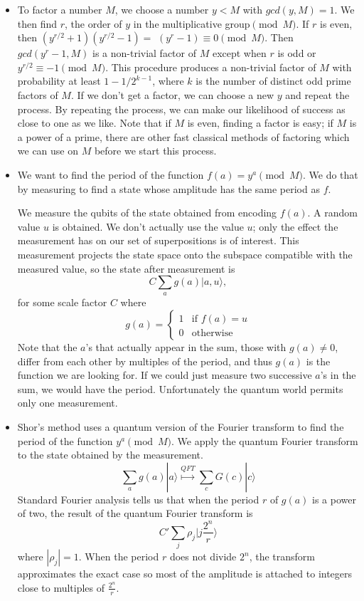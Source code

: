 \documentclass{article}
\def\ket#1{|{#1}\rangle}
\begin{document}
\begin{itemize}
	\item To factor a number $M$, we choose a number $y < M$ with $gcd(y,M) = 1$.  We then find $r$, the order of $y$ in the multiplicative group$\pmod M$.  If $r$ is even, then $(y^{r/2}+1)(y^{r/2}-1)=$ $(y^r-1)\equiv 0\pmod M$.  Then $gcd(y^r-1,M)$ is a non-trivial factor of $M$ except when $r$ is odd or $y^{r/2}\equiv -1\pmod M$.  This procedure produces a non-trivial factor of $M$ with probability at least $1 - 1/2^{k-1}$, where $k$ is the number of distinct odd prime factors of $M$.  If we don't get a factor, we can choose a new $y$ and repeat the process.  By repeating the process, we can make our likelihood of success as close to one as we like. Note that if $M$ is even, finding a factor is easy; if $M$ is a power of a prime, there are other fast classical methods of factoring which we can use on $M$ before we start this process.

\item We want to find the period of the function $f(a)=y^a\pmod M$.  We do that by measuring to find a state whose amplitude has the same period as $f$.

We measure the qubits of the state obtained from encoding $f(a)$. 
A random value $u$ is obtained. We don't actually use the
value $u$; only the
effect the measurement has on our set of superpositions is of interest. 
This measurement projects the state space onto the
subspace compatible with the measured value, so the state after
measurement is 
$$C\sum_{a}g(a)\ket{a,u},$$
for some scale factor $C$ where 
$$g(a) = \left\{ \begin{array}{ll}
                1  & \mbox{if $f(a)=u$} \\
                0  & \mbox{otherwise}
                \end{array}
        \right.$$
Note that the $a$'s that actually appear in the sum, those with $g(a)\ne 0$,
differ from each other by multiples of the period, and thus $g(a)$ is the
function we are looking for. If we could just measure
two successive $a$'s in the sum, we would have the period. 
Unfortunately the quantum world permits only one measurement.

	\item Shor's method uses a quantum version of the Fourier transform to find the period of the function $y^a\pmod M$.
We apply the quantum Fourier transform to the state obtained by the measurement.
$$\sum_{a}g(a)\ket{a} \overset{QFT}\longmapsto \sum_{c}G(c)\ket{c}$$
Standard Fourier analysis tells us that when the
period $r$ of $g(a)$ is a power of two, the result of the quantum Fourier
transform is $$C'\sum_{j}\rho_j\ket{j\frac{2^n}{ r}}$$
where $|\rho_j|=1$.
When the period $r$ does not divide $2^n$, the transform approximates
the exact case so most of the amplitude
is attached to integers close to multiples of $\frac{2^n}{r}$.


\end{itemize}
\end{document}
